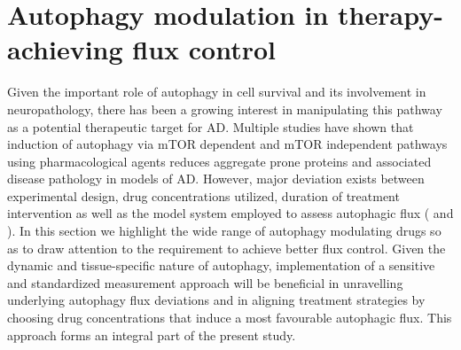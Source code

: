 \section{Autophagy modulation in therapy-achieving flux control}
Given the important role of autophagy in cell survival and its involvement in neuropathology, there has been a growing interest in manipulating this pathway as a potential therapeutic target for AD. Multiple studies have shown that induction of autophagy via mTOR dependent and mTOR independent pathways using pharmacological agents reduces aggregate prone proteins and associated disease pathology in models of AD. However, major deviation exists between experimental design, drug concentrations utilized, duration of treatment intervention as well as the model system employed to assess autophagic flux ( and ). In this section we highlight the wide range of autophagy modulating drugs so as to draw attention to the requirement to achieve better flux control. Given the dynamic and tissue-specific nature of autophagy, implementation of a sensitive and standardized measurement approach will be beneficial in unravelling underlying autophagy flux deviations and in aligning treatment strategies by choosing drug concentrations that induce a most favourable autophagic flux. This approach forms an integral part of the present study.




